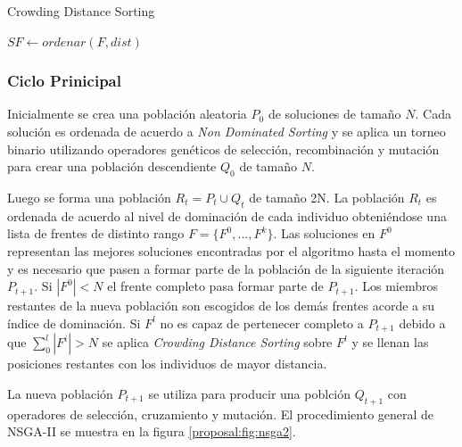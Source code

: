 \begin{algorithm*}[ht]
    \caption{Crowding Distance Sorting}
    \label{proposal:alg:cd}


    $SF \gets ordenar(F, dist)$ 
\end{algorithm*}

\subsubsection{Ciclo Prinicipal}
Inicialmente se crea una poblaci\'on aleatoria $P_0$ de soluciones de tama\~no $N$. Cada soluci\'on es ordenada de acuerdo a \textit{Non Dominated Sorting} y se aplica un torneo binario utilizando operadores gen\'eticos de selecci\'on, recombinaci\'on y mutaci\'on para crear una poblaci\'on descendiente $Q_0$ de tama\~no $N$.

Luego se forma una poblaci\'on $R_t = P_t \cup Q_t$ de tama\~no 2N. La poblaci\'on $R_t$ es ordenada de acuerdo al nivel de dominaci\'on de cada individuo obteni\'endose una lista de frentes de distinto rango $F = \{F^0, ..., F^k\}$. Las soluciones en $F^0$ representan las mejores soluciones encontradas por el algoritmo hasta el momento y es necesario que pasen a formar parte de la poblaci\'on de la siguiente iteraci\'on $P_{t+1}$. Si $|F^0| < N$ el frente completo pasa formar parte de $P_{t+1}$. Los miembros restantes de la nueva poblaci\'on son escogidos de los dem\'as frentes acorde a su \'indice de dominaci\'on. Si $F^l$ no es capaz de pertenecer completo a $P_{t+1}$ debido a que $\sum_0^l |F^i| > N$ se aplica \textit{Crowding Distance Sorting} sobre $F^l$ y se llenan las posiciones restantes con los individuos de mayor distancia.

La nueva poblaci\'on $P_{t+1}$ se utiliza para producir una poblci\'on $Q_{t+1}$ con operadores de selecci\'on, cruzamiento y mutaci\'on. El procedimiento general de NSGA-II se muestra en la figura \ref{proposal:fig:nsga2}.

